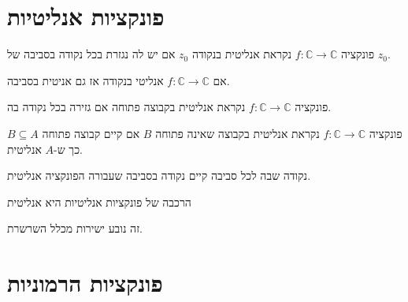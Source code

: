 \documentclass{tstextbook}
\begin{document}
\section{פונקציות אנליטיות}

\begin{definition}
פונקציה \(f:\mathbb{C}\to \mathbb{C}\) נקראת אנליטית בנקודה \(z_{0}\) אם יש לה נגזרת בכל נקודה בסביבה של \(z_{0}\).

\end{definition}
\begin{corollary}
אם \(f:\mathbb{C}\to\mathbb{C}\) אנליטי בנקודה אז גם אניטית בסביבה.

\end{corollary}
\begin{definition}
פונקציה \(f:\mathbb{C}\to \mathbb{C}\) נקראת אנליטית בקבוצה פתוחה אם גזירה בכל נקודה בה.

\end{definition}
\begin{definition}
פונקציה \(f:\mathbb{C}\to \mathbb{C}\) נקראת אנליטית בקבוצה שאינה פתוחה \(B\) אם קיים קבוצה פתוחה \(B\subseteq A\) כך ש-\(A\) אנליטית.

\end{definition}
\begin{definition}
נקודה שבה לכל סביבה קיים נקודה בסביבה שעבורה הפונקציה אנליטית.

\end{definition}
\begin{proposition}
הרכבה של פונקציות אנליטיות היא אנליטית

\end{proposition}
זה נובע ישירות מכלל השרשרת.

\section{פונקציות הרמוניות}
\end{document}
